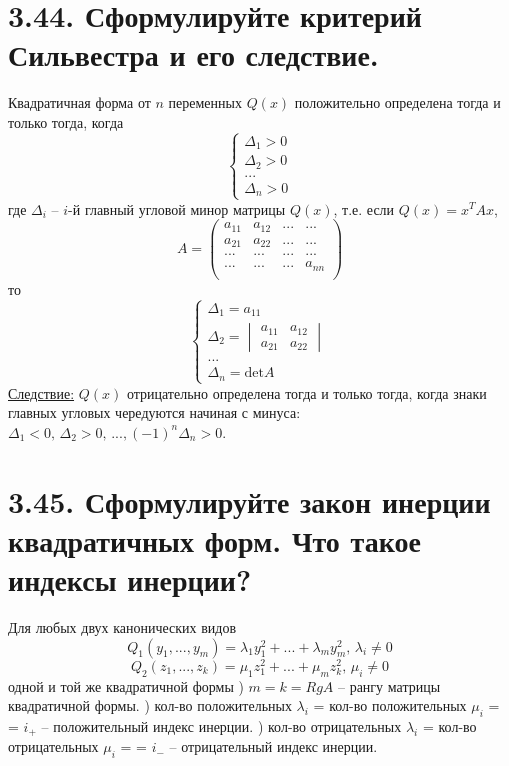 \documentclass{article}
\begin{document}
\section*{\LARGE 3.44. Сформулируйте критерий Сильвестра и его следствие.}
Квадратичная форма от $n$ переменных $Q(x)$ положительно определена тогда и только тогда, когда 
$$
\begin{cases}
\Delta_1 > 0 \\
\Delta_2 > 0 \\ 
...\\
\Delta_n > 0
\end{cases}
$$
где $\Delta_i$ -- $i$-й главный угловой минор матрицы $Q(x)$, т.е. если $Q(x) = x^T A x$, 
$$
A = 
\begin{pmatrix}
a_{11} & a_{12} & ... & ... \\
a_{21} & a_{22} & ... & ... \\
... & ... & ... & ... \\
... & ... & ... & a_{nn} \\
\end{pmatrix}
$$
то
$$
\begin{cases}
\Delta_1 = a_{11} \\
\Delta_2 = \begin{vmatrix} a_{11} & a_{12} \\ a_{21} & a_{22} \end{vmatrix} \\ 
...\\
\Delta_n = \mbox{det}A
\end{cases}
$$
\underline{Следствие:}
\newline $Q(x)$ отрицательно определена тогда и только тогда, когда знаки главных угловых чередуются начиная с минуса: $\Delta_1 < 0,\,\Delta_2 > 0,\,..., (-1)^n\Delta_n > 0$.

\section*{\LARGE 3.45. Сформулируйте закон инерции квадратичных форм. Что такое индексы инерции?}
Для любых двух канонических видов 
$$ Q_1(y_1, ..., y_m) = \lambda_1y_1^2 + ... + \lambda_my_m^2,\, \lambda_i \ne 0$$
$$ Q_2(z_1, ..., z_k) = \mu_1z_1^2 + ... + \mu_mz_k^2,\, \mu_i \ne 0$$
одной и той же квадратичной формы
\newline{}) $m = k = RgA$ -- рангу матрицы квадратичной формы.
\newline{}) кол-во положительных $\lambda_i$ = кол-во положительных $\mu_i$ = 
\newline \indent = $i_+$ -- положительный индекс инерции.
\newline{}) кол-во отрицательных $\lambda_i$ = кол-во отрицательных $\mu_i$ = 
\newline \indent = $i_-$ -- отрицательный индекс инерции.
\end{document}
